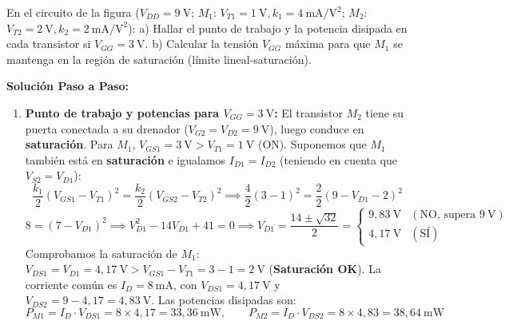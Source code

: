 \begin{ejercicio}
En el circuito de la figura ($V_{DD} = 9\ \si{\volt}$; $M_1$: $V_{T1} = 1\ \si{\volt}, k_1 = 4\ \si{\milli\ampere\per\volt\squared}$; $M_2$: $V_{T2} = 2\ \si{\volt}, k_2 = 2\ \si{\milli\ampere\per\volt\squared}$):
a) Hallar el punto de trabajo y la potencia disipada en cada transistor si $V_{GG} = 3\ \si{\volt}$.
b) Calcular la tensión $V_{GG}$ máxima para que $M_1$ se mantenga en la región de saturación (límite lineal-saturación).
\tcbline
\begin{center}
\end{center}
\textbf{Solución Paso a Paso:}\\[4pt]
\begin{enumerate}[label=\alph*)]
    \item \textbf{Punto de trabajo y potencias para $V_{GG} = 3\ \si{\volt}$:}
    El transistor $M_2$ tiene su puerta conectada a su drenador ($V_{G2} = V_{D2} = 9\ \si{\volt}$), luego conduce en \textbf{saturación}. Para $M_1$, $V_{GS1} = 3\ \si{\volt} > V_{T1} = 1\ \si{\volt}$ (ON). Suponemos que $M_1$ también está en \textbf{saturación} e igualamos $I_{D1} = I_{D2}$ (teniendo en cuenta que $V_{S2} = V_{D1}$):
    \begin{equation}
        \frac{k_1}{2}(V_{GS1} - V_{T1})^2 = \frac{k_2}{2}(V_{GS2} - V_{T2})^2 \implies \frac{4}{2}(3 - 1)^2 = \frac{2}{2}(9 - V_{D1} - 2)^2
    \end{equation}
    \begin{equation}
        8 = (7 - V_{D1})^2 \implies V_{D1}^2 - 14 V_{D1} + 41 = 0 \implies V_{D1} = \frac{14 \pm \sqrt{32}}{2} = \begin{cases} 9{,}83\ \si{\volt} & (\text{NO, supera } 9\ \si{\volt}) \\ 4{,}17\ \si{\volt} & (\text{SÍ}) \end{cases}
    \end{equation}
    Comprobamos la saturación de $M_1$: $V_{DS1} = V_{D1} = 4{,}17\ \si{\volt} > V_{GS1} - V_{T1} = 3 - 1 = 2\ \si{\volt}$ (\textbf{Saturación OK}).
    La corriente común es $I_D = 8\ \si{\milli\ampere}$, con $V_{DS1} = 4{,}17\ \si{\volt}$ y $V_{DS2} = 9 - 4{,}17 = 4{,}83\ \si{\volt}$. Las potencias disipadas son:
    \begin{equation}
        P_{M1} = I_D \cdot V_{DS1} = 8 \times 4{,}17 = 33{,}36\ \si{\milli\watt}, \qquad P_{M2} = I_D \cdot V_{DS2} = 8 \times 4{,}83 = 38{,}64\ \si{\milli\watt}
    \end{equation}


\end{enumerate}
\end{ejercicio}
